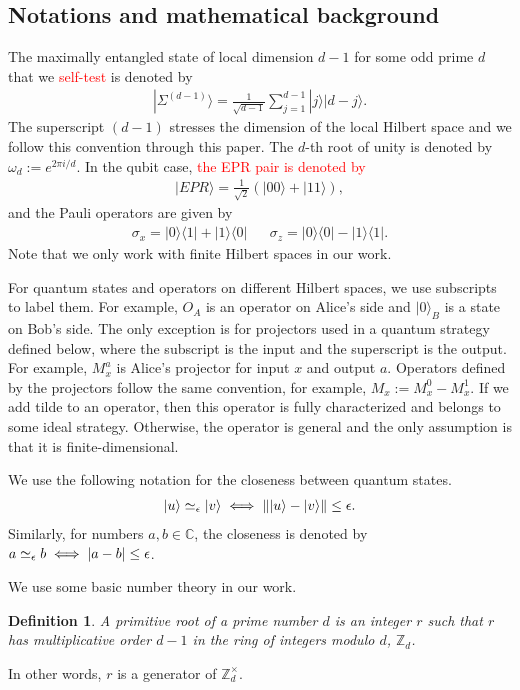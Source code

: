 \documentclass[11pt,letterpaper]{article}
\newcommand{\ket}[1]{|#1\rangle}
\newcommand{\ketbra}[2]{|#1\rangle\langle#2|}
\DeclarePairedDelimiter{\norm}{\lVert}{\rVert}
\DeclarePairedDelimiter{\cnorm}{\lvert}{\rvert}
\newcommand{\C}{\mathbb{C}}
\newcommand{\Z}{\mathbb{Z}}
\newcommand{\Zd}{\Z_d^{\times}}
\newcommand{\1}{\mathbb{1}}
\newcommand{\EPR}[1]{\Sigma^{(#1)}}
\newcommand{\paulix}{\sigma_x}
\newcommand{\pauliz}{\sigma_z}
\newcommand{\appd}[1]{\simeq_{#1}}
\newcommand{\hf}[1]{\textcolor{red}{#1}}
\newtheorem{definition}[theorem]{Definition}
\theoremstyle{definition}
\begin{document}
\subsection{Notations and mathematical background}
The maximally entangled state of local dimension $d-1$ for some odd prime $d$ that we \hf{self-test} is denoted by
\begin{align}
\ket{\EPR{d-1}} = \frac{1}{\sqrt{d-1}} \sum_{j = 1}^{d-1} \ket{j}\ket{d-j}.
\end{align}
The superscript $(d-1)$ stresses the dimension of the local Hilbert space and we follow this convention through this paper.
The $d$-th root of unity is denoted by $\omega_d:=e^{2\pi i/d}$. In the qubit case, 
\hf{the EPR pair is denoted by} 
\begin{align}
	\ket{EPR} = \frac{1}{\sqrt{2}}(\ket{00} + \ket{11}),
\end{align}
and the Pauli operators are given by
\begin{align}
	\paulix = \ketbra{0}{1}+\ketbra{1}{0} && \pauliz = \ketbra{0}{0} - \ketbra{1}{1}.
\end{align}
Note that we only work with finite Hilbert spaces in our work.

For quantum states and operators on different Hilbert spaces, we use subscripts to label them.
For example, $O_A$ is an operator on Alice's side and $\ket{0}_{B}$ is a state on Bob's side. 
The only exception is for projectors used in a quantum strategy defined below, where the subscript 
is the input and the superscript is the output. For example, $M_x^a$ is Alice's projector for input $x$ and output $a$.
Operators defined by the projectors follow the same convention, for example, $M_x := M_x^0 - M_x^1$.
If we add tilde to an operator, then this operator is fully characterized and belongs to some ideal strategy.
Otherwise, the operator is general and the only assumption is that it is finite-dimensional.

We use the following notation for the closeness between quantum states.
\begin{align}
	\ket{u} \appd{\epsilon} \ket{v} \iff \norm{\ket{u} - \ket{v}} \leq \epsilon. 
\end{align}
Similarly, for numbers $a,b \in \C$, the closeness is denoted by
$a \appd{\epsilon} b \iff \cnorm{a-b} \leq \epsilon$.

We use some basic number theory in our work. 
\begin{definition}
A primitive root of a prime number
$d$ is an integer $r$ such that $r$ has multiplicative order $d-1$
in the ring of integers modulo $d$, $\mathbb{Z}_d$.
\end{definition}
In other words,
$r$ is a generator of $\Zd$. 
\end{document}
